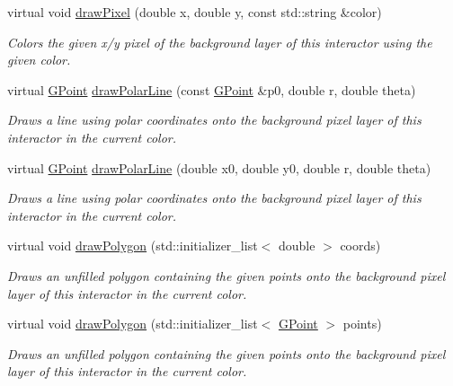 \begin{DoxyCompactItemize}
virtual void \mbox{\hyperlink{classGDrawingSurface_a20abc26a94b7eb310e34abf668e0f5f4}{draw\+Pixel}} (double x, double y, const std\+::string \&color)
\begin{DoxyCompactList}\small\item\em Colors the given x/y pixel of the background layer of this interactor using the given color. \end{DoxyCompactList}\item 
virtual \mbox{\hyperlink{structGPoint}{G\+Point}} \mbox{\hyperlink{classGDrawingSurface_af70cce1e4f708f1ed5b6f29cecb660e7}{draw\+Polar\+Line}} (const \mbox{\hyperlink{structGPoint}{G\+Point}} \&p0, double r, double theta)
\begin{DoxyCompactList}\small\item\em Draws a line using polar coordinates onto the background pixel layer of this interactor in the current color. \end{DoxyCompactList}\item 
virtual \mbox{\hyperlink{structGPoint}{G\+Point}} \mbox{\hyperlink{classGDrawingSurface_ad3e646f90005295f2bbdf37d2bcb39d2}{draw\+Polar\+Line}} (double x0, double y0, double r, double theta)
\begin{DoxyCompactList}\small\item\em Draws a line using polar coordinates onto the background pixel layer of this interactor in the current color. \end{DoxyCompactList}\item 
virtual void \mbox{\hyperlink{classGDrawingSurface_afddec0a905108d8a8d6809a157f26776}{draw\+Polygon}} (std\+::initializer\+\_\+list$<$ double $>$ coords)
\begin{DoxyCompactList}\small\item\em Draws an unfilled polygon containing the given points onto the background pixel layer of this interactor in the current color. \end{DoxyCompactList}\item 
virtual void \mbox{\hyperlink{classGDrawingSurface_a021ee881e0d154dc4dd059698742889c}{draw\+Polygon}} (std\+::initializer\+\_\+list$<$ \mbox{\hyperlink{structGPoint}{G\+Point}} $>$ points)
\begin{DoxyCompactList}\small\item\em Draws an unfilled polygon containing the given points onto the background pixel layer of this interactor in the current color. \end{DoxyCompactList}\item 

\end{DoxyCompactItemize}
